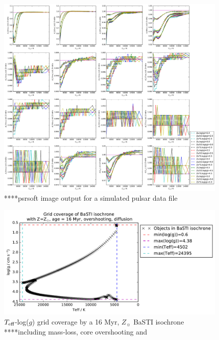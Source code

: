 \documentclass[usenatbib]{mnras}
\begin{document}
\begin{figure}
\begin{center}
\includegraphics[scale=0.3]{../Aall_ratio_Zs_div_Z2_effect_high_logg_zoom_15000.pdf}
\caption{****psrsoft image output for a simulated pulsar data file}
\label{all_Z_Z2_ratio}
\end{center}
\end{figure}

\begin{figure}
\includegraphics[scale=0.4]{../wfc3_16_23Myr_10Gyr_complex_solar/wfc3_ATLAS9_grid_BaSTI_coverage_c16_complex_Zsol_4500.pdf}
\caption{$T_{\textnormal{eff}}$-log($g$) grid coverage by a 16 Myr, $Z_{\sun}$ BaSTI isochrone ****including mass-loss, core overshooting and }
\label{BaSTI_coverage}
\end{figure}
\end{document}
